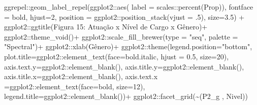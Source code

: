 \documentclass[
]{article}
\newenvironment{Shaded}{\begin{snugshade}}{\end{snugshade}}
\newcommand{\AttributeTok}[1]{\textcolor[rgb]{0.77,0.63,0.00}{#1}}
\newcommand{\DecValTok}[1]{\textcolor[rgb]{0.00,0.00,0.81}{#1}}
\newcommand{\FloatTok}[1]{\textcolor[rgb]{0.00,0.00,0.81}{#1}}
\newcommand{\FunctionTok}[1]{\textcolor[rgb]{0.00,0.00,0.00}{#1}}
\newcommand{\NormalTok}[1]{#1}
\newcommand{\SpecialCharTok}[1]{\textcolor[rgb]{0.00,0.00,0.00}{#1}}
\newcommand{\StringTok}[1]{\textcolor[rgb]{0.31,0.60,0.02}{#1}}
\begin{document}
\begin{Shaded}
\begin{Highlighting}[]
\NormalTok{  ggrepel}\SpecialCharTok{::}\FunctionTok{geom\_label\_repel}\NormalTok{(ggplot2}\SpecialCharTok{::}\FunctionTok{aes}\NormalTok{(}
    \AttributeTok{label =}\NormalTok{ scales}\SpecialCharTok{::}\FunctionTok{percent}\NormalTok{(Prop)),}
    \AttributeTok{fontface =} \StringTok{\textquotesingle{}bold\textquotesingle{}}\NormalTok{,}
    \AttributeTok{hjust=}\DecValTok{2}\NormalTok{,}
    \AttributeTok{position =}\NormalTok{ ggplot2}\SpecialCharTok{::}\FunctionTok{position\_stack}\NormalTok{(}\AttributeTok{vjust =}\NormalTok{ .}\DecValTok{5}\NormalTok{),}
    \AttributeTok{size=}\FloatTok{3.5}\NormalTok{) }\SpecialCharTok{+}
\NormalTok{  ggplot2}\SpecialCharTok{::}\FunctionTok{ggtitle}\NormalTok{(}\StringTok{\textquotesingle{}Figura 15: Atuação x Nível de Cargo x Gênero\textquotesingle{}}\NormalTok{)}\SpecialCharTok{+}
\NormalTok{  ggplot2}\SpecialCharTok{::}\FunctionTok{theme\_void}\NormalTok{()}\SpecialCharTok{+}
\NormalTok{  ggplot2}\SpecialCharTok{::}\FunctionTok{scale\_fill\_brewer}\NormalTok{(}\AttributeTok{type =} \StringTok{"seq"}\NormalTok{, }\AttributeTok{palette =} \StringTok{"Spectral"}\NormalTok{)}\SpecialCharTok{+}
\NormalTok{  ggplot2}\SpecialCharTok{::}\FunctionTok{xlab}\NormalTok{(}\StringTok{\textquotesingle{}Gênero\textquotesingle{}}\NormalTok{)}\SpecialCharTok{+}
\NormalTok{  ggplot2}\SpecialCharTok{::}\FunctionTok{theme}\NormalTok{(}\AttributeTok{legend.position=}\StringTok{"bottom"}\NormalTok{,}
                 \AttributeTok{plot.title=}\NormalTok{ggplot2}\SpecialCharTok{::}\FunctionTok{element\_text}\NormalTok{(}\AttributeTok{face=}\StringTok{\textquotesingle{}bold.italic\textquotesingle{}}\NormalTok{,}
                                                  \AttributeTok{hjust =} \FloatTok{0.5}\NormalTok{, }\AttributeTok{size=}\DecValTok{20}\NormalTok{),}
                 \AttributeTok{axis.text.y=}\NormalTok{ggplot2}\SpecialCharTok{::}\FunctionTok{element\_blank}\NormalTok{(),}
                 \AttributeTok{axis.title.y=}\NormalTok{ggplot2}\SpecialCharTok{::}\FunctionTok{element\_blank}\NormalTok{(),}
                 \AttributeTok{axis.title.x=}\NormalTok{ggplot2}\SpecialCharTok{::}\FunctionTok{element\_blank}\NormalTok{(),}
                 \AttributeTok{axis.text.x =}\NormalTok{ggplot2}\SpecialCharTok{::}\FunctionTok{element\_text}\NormalTok{(}\AttributeTok{face=}\StringTok{\textquotesingle{}bold\textquotesingle{}}\NormalTok{, }\AttributeTok{size=}\DecValTok{12}\NormalTok{),}
                 \AttributeTok{legend.title=}\NormalTok{ggplot2}\SpecialCharTok{::}\FunctionTok{element\_blank}\NormalTok{())}\SpecialCharTok{+}
\NormalTok{  ggplot2}\SpecialCharTok{::}\FunctionTok{facet\_grid}\NormalTok{(}\SpecialCharTok{\textasciitilde{}}\StringTok{\textasciigrave{}}\AttributeTok{(\textquotesingle{}P2\_g \textquotesingle{}, \textquotesingle{}Nivel\textquotesingle{})}\StringTok{\textasciigrave{}}\NormalTok{)}
\end{Highlighting}
\end{Shaded}
\end{document}

